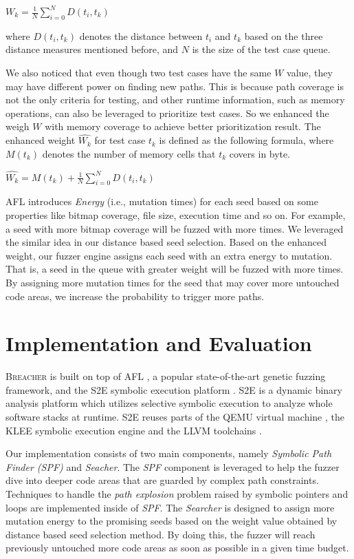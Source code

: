 \documentclass{cta-author}
\newcommand{\prototype}{\textsc{Breacher} }
\begin{document}
\begin{center}
	$W_k = \displaystyle\frac{1}{N} \sum_{i=0}^{N} D(t_i, t_k)$
\end{center}
where $D(t_i, t_k)$ denotes the distance between $t_i$ and $t_k$ 
based on the three distance measures mentioned before, and $N$ is 
the size of the test case queue. 

We also noticed that even though two test cases have the same $W$ value, 
they may have different power on finding new paths.
This is because path coverage is not the only criteria for testing, 
and other runtime information, such as memory operations, 
can also be leveraged to prioritize test cases. 
So we enhanced the weigh $W$ with memory coverage to achieve 
better prioritization result. The enhanced weight $\hat{W_k}$ for 
test case $t_k$ is defined as the following formula, where $M(t_k)$ 
denotes the number of memory cells that $t_k$ covers in byte.
\begin{center}
	$\hat{W_k} = \displaystyle M(t_k) + \frac{1}{N} \sum_{i=0}^{N} D(t_i, t_k)$
\end{center} 

AFL introduces \textit{Energy} (i.e., mutation times) for each seed based 
on some properties like bitmap coverage, file size, execution time and so on.
For example, a seed with more bitmap coverage will be fuzzed with more times. 
We leveraged the similar idea in our distance based seed selection. 
Based on the enhanced weight, our fuzzer engine assigns each seed with an extra
energy to mutation. That is, a seed in the queue with greater weight will
be fuzzed with more times. By assigning more mutation times for the seed that
may cover more untouched code areas, we increase the probability to trigger
more paths.

\section{Implementation and Evaluation} \label{sec:evaluate}
\prototype is built on top of AFL \cite{online:afl}, a popular 
state-of-the-art genetic fuzzing framework, and the S2E symbolic 
execution platform \cite{chipounov2011s2e}. S2E is a dynamic 
binary analysis platform which utilizes selective symbolic execution 
to analyze whole software stacks at runtime. S2E reuses parts of 
the QEMU virtual machine \cite{bellard2005qemu}, the KLEE symbolic 
execution engine \cite{cadar2008klee} and the LLVM 
toolchains \cite{lattner2004llvm}.

Our implementation consists of two main components, namely
\emph{Symbolic Path Finder (SPF)} and \emph{Seacher}. The \emph{SPF}
component is leveraged to help the fuzzer dive into deeper code areas
that are guarded by complex path constraints. Techniques to handle the
\textit{path explosion} problem raised by symbolic pointers and loops
are implemented inside of \emph{SPF}. The \emph{Searcher} is designed
to assign more mutation energy to the promising seeds based on the weight
value obtained by distance based seed selection method. 
By doing this, the fuzzer will reach previously
untouched more code areas as soon as possible in a given time budget.
\end{document}

